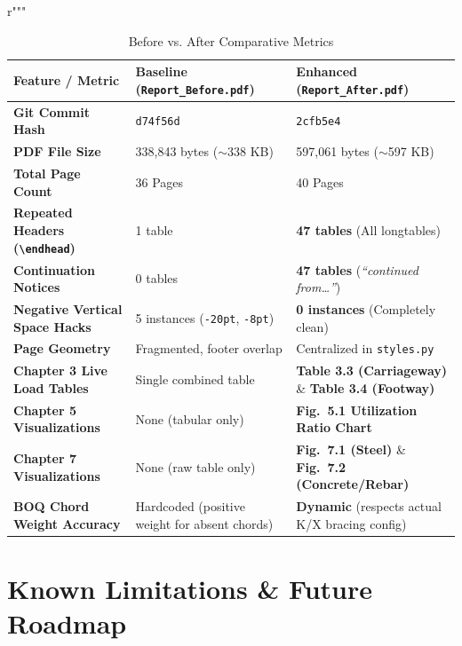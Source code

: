 r"""\documentclass[11pt,a4paper]{article}
\begin{document}
\begin{table}[h!]
\centering
\small
\begin{tabular}{|L{4.5cm}|L{4.5cm}|L{4.5cm}|}
\hline
\textbf{Feature / Metric} & \textbf{Baseline (\texttt{Report\_Before.pdf})} & \textbf{Enhanced (\texttt{Report\_After.pdf})} \\
\hline
\textbf{Git Commit Hash} & \texttt{d74f56d} & \texttt{2cfb5e4} \\
\textbf{PDF File Size} & 338,843 bytes ($\sim$338 KB) & 597,061 bytes ($\sim$597 KB) \\
\textbf{Total Page Count} & 36 Pages & 40 Pages \\
\textbf{Repeated Headers (\texttt{\textbackslash endhead})} & 1 table & \textbf{47 tables} (All longtables) \\
\textbf{Continuation Notices} & 0 tables & \textbf{47 tables} (\textit{``continued from\ldots''}) \\
\textbf{Negative Vertical Space Hacks} & 5 instances (\texttt{-20pt}, \texttt{-8pt}) & \textbf{0 instances} (Completely clean) \\
\textbf{Page Geometry} & Fragmented, footer overlap & Centralized in \texttt{styles.py} \\
\textbf{Chapter 3 Live Load Tables} & Single combined table & \textbf{Table 3.3 (Carriageway)} \& \textbf{Table 3.4 (Footway)} \\
\textbf{Chapter 5 Visualizations} & None (tabular only) & \textbf{Fig.~5.1 Utilization Ratio Chart} \\
\textbf{Chapter 7 Visualizations} & None (raw table only) & \textbf{Fig.~7.1 (Steel)} \& \textbf{Fig.~7.2 (Concrete/Rebar)} \\
\textbf{BOQ Chord Weight Accuracy} & Hardcoded (positive weight for absent chords) & \textbf{Dynamic} (respects actual K/X bracing config) \\
\hline
\end{tabular}
\caption{Before vs. After Comparative Metrics}
\end{table}

\section{Known Limitations \& Future Roadmap}
\end{document}

